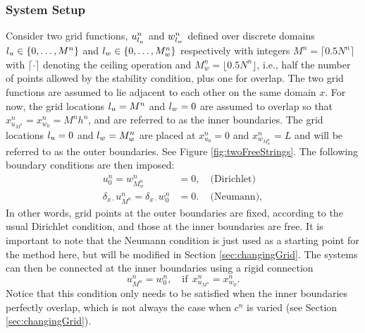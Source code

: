 \subsubsection{System Setup}\label{sec:systSetup}
Consider two grid functions, $u_{l_u}^n$ and $w_{l_w}^n$ defined over discrete domains ${l_u} \in \{0, \hdots, M^n\}$ and ${l_w} \in \{0, \hdots, M_w^n\}$ respectively with integers $M^n = \lceil 0.5N^n\rceil $ with $\lceil \cdot \rceil$ denoting the ceiling operation and $M_w^n = \lfloor 0.5N^n\rfloor$, i.e., half the number of points allowed by the stability condition, plus one for overlap. The two grid functions are assumed to lie adjacent to each other on the same domain $x$. For now, the grid locations ${l_u} = M^n$   and ${l_w} = 0$ are assumed to overlap so that $x_{u_{M^n}}^n = x_{w_0}^n = M^nh^n$, and are referred to as the inner boundaries. The grid locations ${l_u} = 0$ and ${l_w} = M_w^n$ are placed at $x_{u_0}^n = 0$ and $x_{w_{M_w^n}}^n = L$ and will be referred to as the outer boundaries. See Figure \ref{fig:twoFreeStrings}. The following boundary conditions are then imposed:
\begin{subequations}\label{eq:halfStringBoundaryCond}
    \begin{align}
        u_0^n = w_{M_w^n}^n &= 0,\quad \text{(Dirichlet)}\label{eq:halfStringBoundaryCondDirichlet}\\
        \delta_{x\cdot}u_{M^n}^n = \delta_{x\cdot}w_0^n &= 0.\, \quad\text{(Neumann)}, \label{eq:halfStringBoundaryCondNeumann}
    \end{align}
\end{subequations}
In other words, grid points at the outer boundaries are fixed, according to the usual Dirichlet condition, and those at the inner boundaries are free. \SWcomment[***$\rightarrow$]It is important to note that the Neumann condition is just used as a starting point for the method here, but will be modified in Section \ref{sec:changingGrid}. \SWcomment[$\leftarrow$***]%
%
%
The systems can then be connected at the inner boundaries using a rigid connection
\begin{equation}\label{eq:rigid}
    u_{M^n}^n = w_0^n, \quad \text{if}\ \ x_{u_{M^n}}^n = x_{w_0}^n.
\end{equation}
Notice that this condition only needs to be satisfied when the inner boundaries perfectly overlap, which is not always the case when $c^n$ is varied (see Section \ref{sec:changingGrid}).

